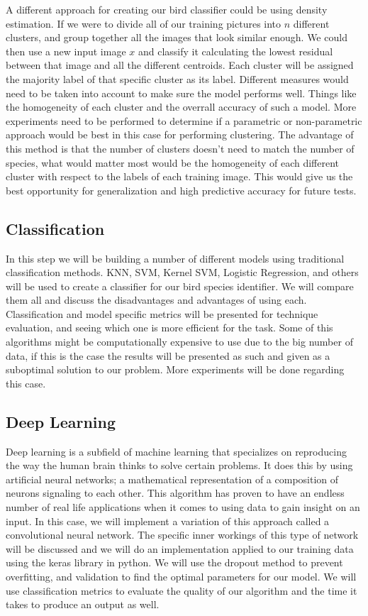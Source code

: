 \documentclass[11pt]{article}
\begin{document}
\begin{singlespace}
A different approach for creating our bird classifier could be using density estimation. If we were to divide all of our training pictures into $n$ different clusters, and group together all the images that look similar enough. We could then use a new input image $x$ and classify it calculating the lowest residual between that image and all the different centroids. Each cluster will be assigned the majority label of that specific cluster as its label. Different measures would need to be taken into account to make sure the model performs well. Things like the homogeneity of each cluster and the overrall accuracy of such a model. More experiments need to be performed to determine if a parametric or non-parametric approach would be best in this case for performing clustering. The advantage of this method is that the number of clusters doesn't need to match the number of species, what would matter most would be the homogeneity of each different cluster with respect to the labels of each training image. This would give us the best opportunity for generalization and high predictive accuracy for future tests. 

\subsection{Classification}

In this step we will be building a number of different models using traditional classification methods. KNN, SVM, Kernel SVM, Logistic Regression, and others will be used to create a classifier for our bird species identifier. We will compare them all and discuss the disadvantages and advantages of using each. Classification and model specific metrics will be presented for technique evaluation, and seeing which one is more efficient for the task. Some of this algorithms might be computationally expensive to use due to the big number of data, if this is the case the results will be presented as such and given as a suboptimal solution to our problem. More experiments will be done regarding this case. 

\subsection{Deep Learning}

Deep learning is a subfield of machine learning that specializes on reproducing the way the human brain thinks to solve certain problems. It does this by using artificial neural networks; a mathematical representation of a composition of neurons signaling to each other. This algorithm has proven to have an endless number of real life applications when it comes to using data to gain insight on an input. In this case, we will implement a variation of this approach called a convolutional neural network. The specific inner workings of this type of network will be discussed and we will do an implementation applied to our training data using the keras library in python. We will use the dropout method to prevent overfitting, and validation to find the optimal parameters for our model. We will use classification metrics to evaluate the quality of our algorithm and the time it takes to produce an output as well. 


\end{singlespace}
\end{document}
